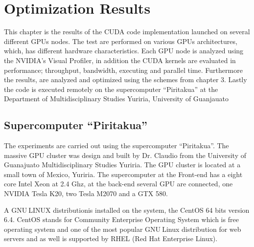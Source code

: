 
\chapter{Optimization Results} %

\label{Optimization Results} %



This chapter is the results of the CUDA code implementation launched on several different GPUs nodes. The test are performed on various GPUs architectures, which, has different hardware characteristics. Each GPU node is analyzed using the NVIDIA's Visual Profiler, in addition the CUDA kernels are evaluated in performance; throughput, bandwidth, executing and parallel time. Furthermore the results, are analyzed and optimized using the schemes from chapter 3. Lastly the code is executed remotely on the supercomputer ``Piritakua'' at the Department of Multidisciplinary Studies Yuriria, University of Guanjauato

\section{Supercomputer ``Piritakua''}

The experiments are carried out using the supercomputer “Piritakua”. The massive GPU cluster was design and built by Dr. Claudio from the University of Guanajuato Multidisciplinary Studies Yuriria. The GPU cluster is located at a small town of Mexico, Yuriria. The supercomputer at the Front-end has a eight core Intel Xeon at 2.4 Ghz, at the back-end several GPU are connected, one NVIDIA Tesla K20, two Tesla M2070 and a GTX 580.

A GNU$ \ $LINUX distributionis installed on the system, the CentOS 64 bits version 6.4. CentOS stands for Community Enterprise Operating System which is free operating system and one of the most popular GNU$ \ $Linux distribution for web servers and as well is supported by RHEL (Red Hat Enterprise Linux). \cite{centos} 

